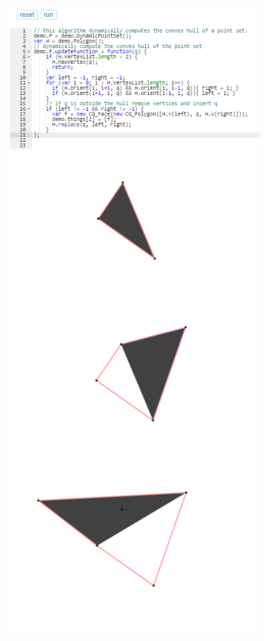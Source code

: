 \documentclass[a4paper,UKenglish]{lipics-v2016}
\begin{document}
\begin{figure}[htbp]
  \centering 
  \includegraphics[scale=0.84]{demo.png}
  \includegraphics[scale=0.195]{figs.png}

\end{figure}
\end{document}
